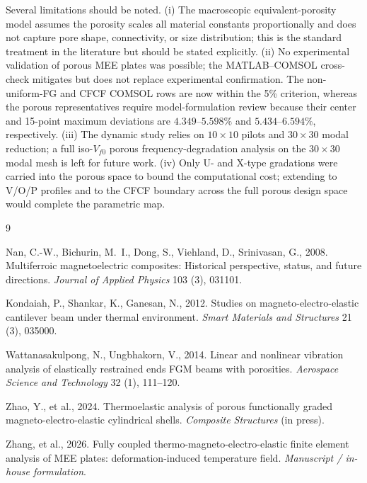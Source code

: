 \documentclass[11pt,a4paper]{article}
\begin{document}
Several limitations should be noted. (i) The macroscopic equivalent-porosity model assumes the porosity scales all material constants proportionally and does not capture pore shape, connectivity, or size distribution; this is the standard treatment in the literature but should be stated explicitly. (ii) No experimental validation of porous MEE plates was possible; the MATLAB--COMSOL cross-check mitigates but does not replace experimental confirmation. The non-uniform-FG and CFCF COMSOL rows are now within the 5\% criterion, whereas the porous representatives require model-formulation review because their center and 15-point maximum deviations are $4.349$--$5.598\%$ and $5.434$--$6.594\%$, respectively. (iii) The dynamic study relies on $10\times10$ pilots and $30\times30$ modal reduction; a full iso-$V_{f0}$ porous frequency-degradation analysis on the $30\times30$ modal mesh is left for future work. (iv) Only U- and X-type gradations were carried into the porous space to bound the computational cost; extending to V/O/P profiles and to the CFCF boundary across the full porous design space would complete the parametric map.

\begin{thebibliography}{9}

Nan, C.-W., Bichurin, M.~I., Dong, S., Viehland, D., Srinivasan, G., 2008.
Multiferroic magnetoelectric composites: Historical perspective, status, and future directions.
\textit{Journal of Applied Physics} 103 (3), 031101.

Kondaiah, P., Shankar, K., Ganesan, N., 2012.
Studies on magneto-electro-elastic cantilever beam under thermal environment.
\textit{Smart Materials and Structures} 21 (3), 035000.

Wattanasakulpong, N., Ungbhakorn, V., 2014.
Linear and nonlinear vibration analysis of elastically restrained ends FGM beams with porosities.
\textit{Aerospace Science and Technology} 32 (1), 111--120.

Zhao, Y., et al., 2024.
Thermoelastic analysis of porous functionally graded magneto-electro-elastic cylindrical shells.
\textit{Composite Structures} (in press).

Zhang, et al., 2026.
Fully coupled thermo-magneto-electro-elastic finite element analysis of MEE plates: deformation-induced temperature field.
\textit{Manuscript / in-house formulation}.

\end{thebibliography}
\end{document}
